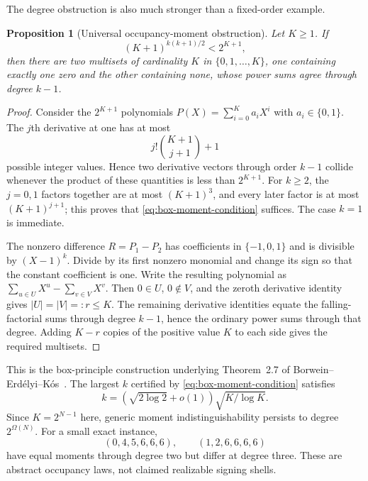 \documentclass[11pt]{article}
\newtheorem{proposition}[theorem]{Proposition}
\begin{document}
The degree obstruction is also much stronger than a fixed-order example.

\begin{proposition}[Universal occupancy-moment obstruction]
\label{prop:occupancy-moment-obstruction}
Let $K\ge1$.  If
\begin{equation}
 (K+1)^{k(k+1)/2}<2^{K+1},                            \label{eq:box-moment-condition}
\end{equation}
then there are two multisets of cardinality $K$ in
$\{0,1,\ldots,K\}$, one containing exactly one zero and the other containing
none, whose power sums agree through degree $k-1$.
\end{proposition}

\begin{proof}
Consider the $2^{K+1}$ polynomials
$P(X)=\sum_{i=0}^Ka_iX^i$ with $a_i\in\{0,1\}$.  The $j$th derivative at one
has at most
\[
 j!\binom{K+1}{j+1}+1
\]
possible integer values.  Hence two derivative vectors through order $k-1$
collide whenever the product of these quantities is less than $2^{K+1}$.
For $k\ge2$, the $j=0,1$ factors together are at most $(K+1)^3$, and every
later factor is at most $(K+1)^{j+1}$; this proves that
\eqref{eq:box-moment-condition} suffices.  The case $k=1$ is immediate.

The nonzero difference $R=P_1-P_2$ has coefficients in $\{-1,0,1\}$ and is
divisible by $(X-1)^k$.  Divide by its first nonzero monomial and change its
sign so that the constant coefficient is one.  Write the resulting polynomial
as $\sum_{u\in U}X^u-\sum_{v\in V}X^v$.  Then $0\in U$, $0\notin V$, and the
zeroth derivative identity gives $|U|=|V|=:r\le K$.  The remaining derivative
identities equate the falling-factorial sums through degree $k-1$, hence the
ordinary power sums through that degree.  Adding $K-r$ copies of the positive
value $K$ to each side gives the required multisets.
\end{proof}

This is the box-principle construction underlying
Theorem~2.7 of Borwein--Erd\'elyi--K\'os~\cite{borwein-erdelyi-kos}.
The largest $k$ certified by \eqref{eq:box-moment-condition} satisfies
\[
 k=(\sqrt{2\log2}+o(1))\sqrt{K/\log K}.
\]
Since $K=2^{N-1}$ here, generic moment indistinguishability persists to degree
$2^{\Omega(N)}$.  For a small exact instance,
\[
 (0,4,5,6,6,6),\qquad(1,2,6,6,6,6)
\]
have equal moments through degree two but differ at degree three.  These are
abstract occupancy laws, not claimed realizable signing shells.
\end{document}
